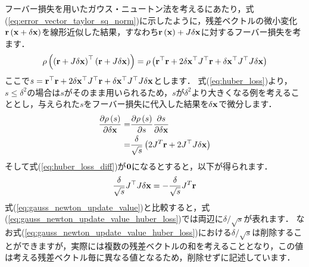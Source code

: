 フーバー損失を用いたガウス・ニュートン法を考えるにあたり，式(\ref{eq:error_vector_taylor_sq_norm})に示したように，残差ベクトルの微小変化${\bf r} \left( {\bf x} + \delta {\bf x} \right)$を線形近似した結果，すなわち${\bf r} \left( {\bf x} \right) + J \delta {\bf x}$に対するフーバー損失を考ます．
%
\begin{align}
  \rho \left( \left( {\bf r} + J \delta {\bf x} \right)^{\top} \left( {\bf r} + J \delta {\bf x} \right) \right)
  =
  \rho \left( {\bf r}^{\top} {\bf r} + 2 \delta {\bf x}^{\top} J^{\top} {\bf r} + \delta {\bf x}^{\top} J^{\top} J \delta {\bf x} \right)
\end{align}
%
ここで$s = {\bf r}^{\top} {\bf r} + 2 \delta {\bf x}^{\top} J^{\top} {\bf r} + \delta {\bf x}^{\top} J^{\top} J \delta {\bf x}$とします．
式(\ref{eq:huber_loss})より，$s \leq \delta^{2}$の場合は$s$がそのまま用いられるため，$s$が$\delta^{2}$より大きくなる例を考えることとし，与えられた$s$をフーバー損失に代入した結果を$\delta {\bf x}$で微分します．
%
\begin{align}
  \begin{split}
    \frac{ \partial \rho \left( s \right) }{ \partial \delta {\bf x} }
    = &
    \frac{ \partial \rho \left( s \right) }{ \partial s }
    \frac{ \partial s }{ \partial \delta {\bf x} } \\
    = &
    \frac{ \delta }{ \sqrt{s} } \left( 2 J^{T} {\bf r} + 2 J^{\top} J \delta {\bf x} \right)
  \end{split}
  \label{eq:huber_loss_diff}
\end{align}
%
そして式(\ref{eq:huber_loss_diff})が${\bf 0}$になるとすると，以下が得られます．
%
\begin{align}
  \frac{ \delta }{ \sqrt{s} } J^{\top} J \delta {\bf x} = -\frac{ \delta }{ \sqrt{s} } J^{T} {\bf r}
  \label{eq:gauss_newton_update_value_huber_loss}
\end{align}
%
式(\ref{eq:gauss_newton_update_value})と比較すると，式(\ref{eq:gauss_newton_update_value_huber_loss})では両辺に$\delta / \sqrt{s}$が表れます．
なお式(\ref{eq:gauss_newton_update_value_huber_loss})における$\delta / \sqrt{s}$は削除することができますが，実際には複数の残差ベクトルの和を考えることとなり，この値は考える残差ベクトル毎に異なる値となるため，削除せずに記述しています．

